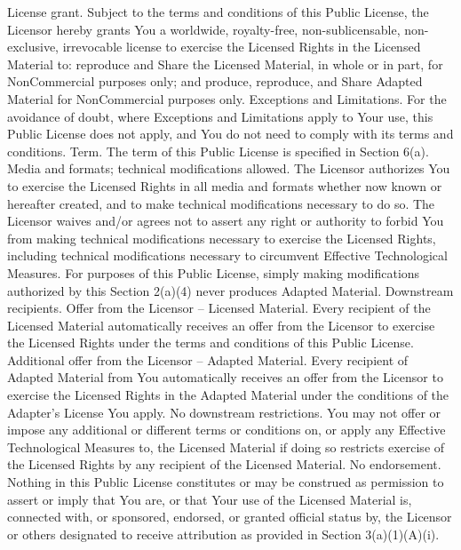 {    License grant.
        Subject to the terms and conditions of this Public License, the Licensor hereby grants You a worldwide, royalty-free, non-sublicensable, non-exclusive, irrevocable license to exercise the Licensed Rights in the Licensed Material to:
            reproduce and Share the Licensed Material, in whole or in part, for NonCommercial purposes only; and
            produce, reproduce, and Share Adapted Material for NonCommercial purposes only.
        Exceptions and Limitations. For the avoidance of doubt, where Exceptions and Limitations apply to Your use, this Public License does not apply, and You do not need to comply with its terms and conditions.
        Term. The term of this Public License is specified in Section 6(a).
        Media and formats; technical modifications allowed. The Licensor authorizes You to exercise the Licensed Rights in all media and formats whether now known or hereafter created, and to make technical modifications necessary to do so. The Licensor waives and/or agrees not to assert any right or authority to forbid You from making technical modifications necessary to exercise the Licensed Rights, including technical modifications necessary to circumvent Effective Technological Measures. For purposes of this Public License, simply making modifications authorized by this Section 2(a)(4) never produces Adapted Material.
        Downstream recipients.
            Offer from the Licensor – Licensed Material. Every recipient of the Licensed Material automatically receives an offer from the Licensor to exercise the Licensed Rights under the terms and conditions of this Public License.
            Additional offer from the Licensor – Adapted Material. Every recipient of Adapted Material from You automatically receives an offer from the Licensor to exercise the Licensed Rights in the Adapted Material under the conditions of the Adapter’s License You apply.
            No downstream restrictions. You may not offer or impose any additional or different terms or conditions on, or apply any Effective Technological Measures to, the Licensed Material if doing so restricts exercise of the Licensed Rights by any recipient of the Licensed Material.
        No endorsement. Nothing in this Public License constitutes or may be construed as permission to assert or imply that You are, or that Your use of the Licensed Material is, connected with, or sponsored, endorsed, or granted official status by, the Licensor or others designated to receive attribution as provided in Section 3(a)(1)(A)(i).

}

